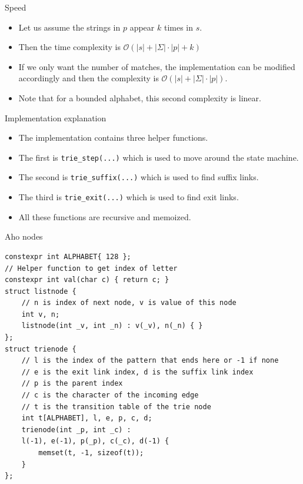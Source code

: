 \documentclass{beamer}
\begin{document}
	\begin{frame}[plain]{Speed}
		\begin{itemize}
			\item Let us assume the strings in $p$ appear $k$ times in $s$.
			\item Then the time complexity is $\mathcal{O}(|s| + |\Sigma| \cdot |p| + k)$
			\item If we only want the number of matches, the implementation can be modified accordingly and then the complexity is $\mathcal{O}(|s| + |\Sigma| \cdot |p|)$.
			\item Note that for a bounded alphabet, this second complexity is linear.
		\end{itemize}
	\end{frame}
	
	\begin{frame}[plain]{Implementation explanation}
		\begin{itemize}
			\item The implementation contains three helper functions.
			\item The first is \texttt{trie\_step(...)} which is used to move around the state machine.
			\item The second is \texttt{trie\_suffix(...)} which is used to find suffix links.
			\item The third is \texttt{trie\_exit(...)} which is used to find exit links.
			\item All these functions are recursive and memoized.
		\end{itemize}
	\end{frame}
	
	\begin{frame}{Aho nodes}
		\scriptsize
		\begin{verbatim}
constexpr int ALPHABET{ 128 };
// Helper function to get index of letter
constexpr int val(char c) { return c; }
struct listnode {
	// n is index of next node, v is value of this node
	int v, n;
	listnode(int _v, int _n) : v(_v), n(_n) { }
};
struct trienode {
	// l is the index of the pattern that ends here or -1 if none
	// e is the exit link index, d is the suffix link index
	// p is the parent index
	// c is the character of the incoming edge
	// t is the transition table of the trie node
	int t[ALPHABET], l, e, p, c, d;
	trienode(int _p, int _c) :
	l(-1), e(-1), p(_p), c(_c), d(-1) {
		memset(t, -1, sizeof(t));
	}
};
		\end{verbatim}
	\end{frame}
	
\end{document}
